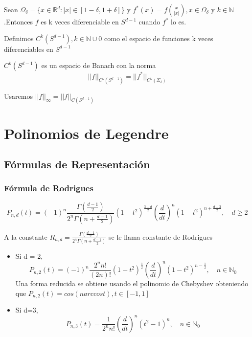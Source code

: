 \begin{prop}Sean $\Omega_\delta = \{x\in\mathds{R}^d : |x|\in[1-\delta,1+\delta]\}$ y $f^*(x)= f(\frac{x}{|x|}),x\in\Omega_\delta$ y $k\in\mathds{N}$.Entonces $f$ es k veces diferenciable en $S^{d-1}$ cuando $f^*$ lo es.  
\end{prop}
\begin{defn}Definimos $C^k(S^{d-1}), k\in\mathds{N}\cup0$ como el espacio de funciones k veces diferenciables en $S^{d-1}$
\end{defn}
\begin{prop}$C^k(S^{d-1})$ es un espacio de Banach con la norma 
	$$
	||f||_{C^k(S^{d-1})} = ||f^*||_{C^k(\Sigma_\delta)}
	$$
\end{prop}
\begin{rem}Usaremos $||f||_\infty = ||f||_{C(S^{d-1})}$
	
\end{rem}
\chapter{Polinomios de Legendre}\label{aped.C}
\section{Fórmulas de Representación}
\subsection{Fórmula de Rodrigues}
\begin{thm}
	$$P_{n,d}(t) = (-1)^n \frac{\Gamma(\frac{d-1}{2}) }{2^n\Gamma(n+\frac{d-1}{2})}(1-t^2)^{\frac{3-d}{2}}(\frac{d}{dt})^n (1-t^2)^{n+\frac{d-3}{2}}, \quad d\ge2
	$$
\end{thm}
\begin{rem}\label{cte_Rod}
	A la constante $R_{n,d} = \frac{\Gamma(\frac{d-1}{2})}{2^n\Gamma(n+\frac{d-1}{2})}$ se le llama constante de Rodrigues
\end{rem}
\begin{example}
	\begin{itemize}
		\item Si d = 2, $$P_{n,2}(t) = (-1)^n \frac{2^n n!} {(2n)!}(1-t^2)^{\frac{1}{2}}(\frac{d}{dt})^n (1-t^2)^{n-\frac{1}{2}}, \quad n\in \mathds{N}_0$$ Una forma reducida se obtiene usando el polinomio de Chebyshev obteniendo que $P_{n,2}(t) = cos(n arccos t), t\in[-1,1]$
		\item Si d=3, $$P_{n,3}(t) = \frac{1} {2^n n!}(\frac{d}{dt})^n (t^2-1)^{n}, \quad n\in \mathds{N}_0$$
	\end{itemize}
\end{example}
